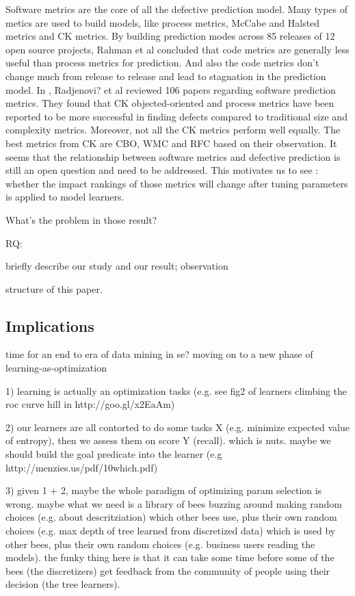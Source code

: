 \documentclass{sig-alternative}
\begin{document}
Software metrics are the core of all the defective prediction model. Many types of metics
are used to build models, like process metrics, McCabe and Halsted metrics  and CK metrics.
By building prediction modes across 85 releases of 12 open source projects, Rahman et al
\cite{rahman2013how}  concluded that code metrics are generally less useful than process
metrics for prediction. And also the code metrics don't change much from release to release
and lead to stagnation in the prediction model. In \cite{Radjenovi?20131397}, Radjenovi? et al
\cite{Radjenovi?20131397} reviewed 106 papers regarding software prediction metrics. They found
that CK objected-oriented and process metrics have been reported to be more successful in
finding defects compared to traditional size and complexity metrics. Moreover, not all the CK
metrics perform well equally. The best metrics from CK are CBO, WMC and RFC based on their 
observation. It seems that the relationship between software metrics and defective prediction is
still an open question and need to be addressed. This motivates us to see : whether the impact
rankings of those metrics will change after tuning parameters
is applied to model learners.



What's the problem in those result?

RQ:

briefly describe our study and  our result; observation

structure of this paper.

\subsection{Implications}

time for an end to era of data mining in se? moving on to a new phase of learning-as-optimization

1) learning is actually an optimization tasks (e.g. see fig2 of  learners climbing the roc curve hill in http://goo.gl/x2EaAm)

2) our learners are all contorted to do some tasks X (e.g. minimize expected value of entropy), then we assess them on score Y (recall). which is nuts. maybe we should build the goal predicate into the learner (e.g http://menzies.us/pdf/10which.pdf) 

3) given 1 + 2, maybe the whole paradigm of optimizing param selection is wrong. maybe what we need is a library of bees buzzing around making random choices (e.g. about descritziation) which other bees use, plus their own random choices (e.g. max depth of tree learned from discretized data) which is used by other bees, plus their own random choices (e.g. business users reading the models).  the funky thing here is that it can take some time before some of the bees (the discretizers) get feedback from the community of people using their decision (the tree learners). 
\end{document}
